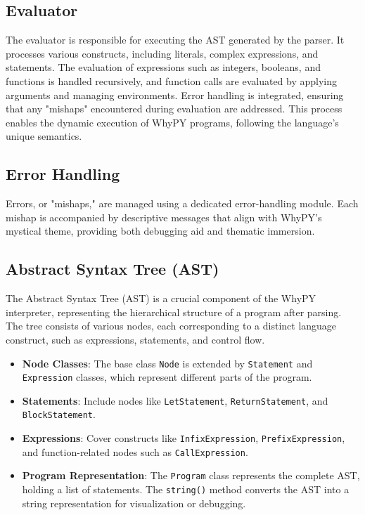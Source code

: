\documentclass[conference]{IEEEtran}
\begin{document}
\subsection{Evaluator}
The evaluator is responsible for executing the AST generated by the parser. It processes various constructs, including literals, complex expressions, and statements. The evaluation of expressions such as integers, booleans, and functions is handled recursively, and function calls are evaluated by applying arguments and managing environments. Error handling is integrated, ensuring that any "mishaps" encountered during evaluation are addressed. This process enables the dynamic execution of WhyPY programs, following the language’s unique semantics.

\subsection{Error Handling}
Errors, or "mishaps," are managed using a dedicated error-handling module. Each mishap is accompanied by descriptive messages that align with WhyPY’s mystical theme, providing both debugging aid and thematic immersion.

\subsection{Abstract Syntax Tree (AST)}

The Abstract Syntax Tree (AST) is a crucial component of the WhyPY interpreter, representing the hierarchical structure of a program after parsing. The tree consists of various nodes, each corresponding to a distinct language construct, such as expressions, statements, and control flow.

\begin{itemize}
    \item \textbf{Node Classes}: The base class \texttt{Node} is extended by \texttt{Statement} and \texttt{Expression} classes, which represent different parts of the program.
    \item \textbf{Statements}: Include nodes like \texttt{LetStatement}, \texttt{ReturnStatement}, and \texttt{BlockStatement}.
    \item \textbf{Expressions}: Cover constructs like \texttt{InfixExpression}, \texttt{PrefixExpression}, and function-related nodes such as \texttt{CallExpression}.
    \item \textbf{Program Representation}: The \texttt{Program} class represents the complete AST, holding a list of statements. The \texttt{string()} method converts the AST into a string representation for visualization or debugging.
\end{itemize}
\end{document}
